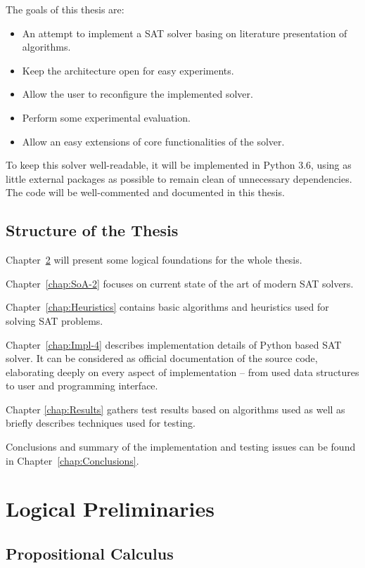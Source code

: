 \documentclass[12pt,english,pdflatex]{aghdpl}
\begin{document}
The goals of this thesis are:
\begin{itemize}
\item An attempt to implement a SAT solver basing on literature presentation of algorithms.
\item Keep the architecture open for easy experiments.
\item Allow the user to reconfigure the implemented solver.
\item Perform some experimental evaluation.
\item Allow an easy extensions of core functionalities of the solver.
\end{itemize}

To keep this solver well-readable,
it will be implemented in Python 3.6, using as little external packages
as possible to remain clean of unnecessary dependencies.
The code will be well-commented and documented in this thesis.

\section{Structure of the Thesis}
\label{sec:structure}

Chapter~\ref{chap:logic} will present some logical foundations for the whole thesis.

Chapter~\ref{chap:SoA-2}  focuses on current state of the art of modern SAT solvers.

Chapter~\ref{chap:Heuristics}  contains basic algorithms and heuristics used for solving
SAT problems. 

Chapter~\ref{chap:Impl-4} describes implementation details of Python
based SAT solver. It can be considered as official documentation of
the source code, elaborating deeply on every aspect of implementation
-- from used data structures to user and programming interface. 

Chapter \ref{chap:Results}  gathers test results based on algorithms used as well as briefly
describes techniques used for testing. 

Conclusions and summary of the
implementation  and testing issues can be found in Chapter~\ref{chap:Conclusions}.

\chapter{Logical Preliminaries}
\label{chap:logic}
\section{Propositional Calculus}
\label{sec:PC}
\end{document}
